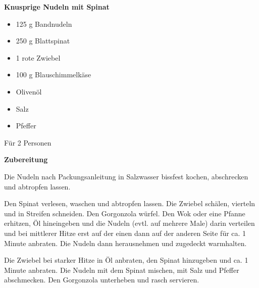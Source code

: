 


\parindent0pt	

\pagestyle{empty}


\textbf{{\LARGE Knusprige Nudeln mit Spinat}}%


\hrulefill
\vspace*{\fill}
\begin{multicols}{2}	


\begin{itemize}
\item  125 g Bandnudeln
\item  250 g Blattspinat
\item  1 rote Zwiebel
\item 100 g Blauschimmelkäse
\item  Olivenöl
\item  Salz 
\item Pfeffer
\end{itemize}
\vfill									
\end{multicols}

\vspace{2cm}			%
\begin{center}			%
Für 2 Personen
\end{center}


\vfill
\newpage
\textbf{{\LARGE Zubereitung}}%

\hrulefill

\vspace*{\fill}
\begin{multicols}{2}

Die Nudeln nach Packungsanleitung in Salzwasser bissfest kochen, abschrecken und abtropfen lassen.

Den Spinat verlesen, waschen und abtropfen lassen. Die Zwiebel schälen, vierteln und in 
Streifen schneiden.
Den Gorgonzola würfel.
Den Wok oder eine Pfanne erhitzen, Öl hineingeben und die Nudeln (evtl. auf mehrere Male)
darin verteilen und bei mittlerer Hitze erst auf der einen dann auf der anderen Seite für 
ca. 1 Minute anbraten. Die Nudeln dann herausnehmen und zugedeckt warmhalten.

Die Zwiebel bei starker Hitze in Öl anbraten, den Spinat hinzugeben und ca. 1 Minute
anbraten. Die Nudeln mit dem Spinat mischen, mit Salz und Pfeffer abschmecken.
Den Gorgonzola unterheben und rasch servieren.


\end{multicols}
\vfill
